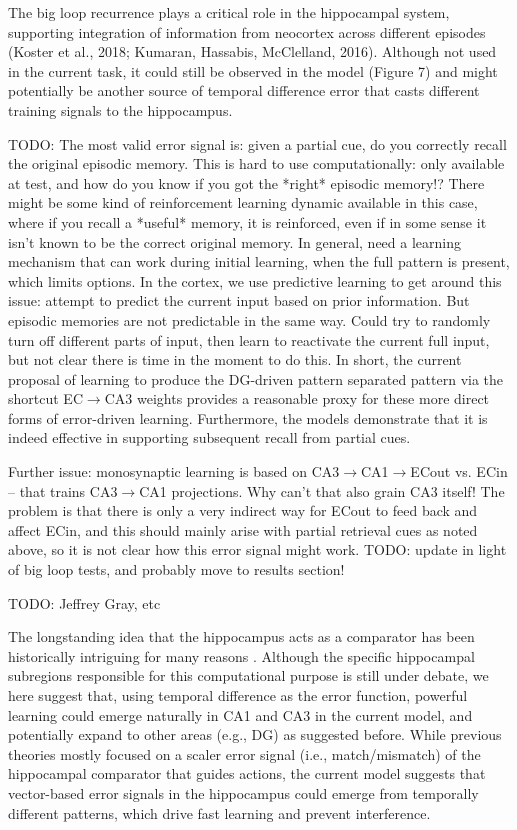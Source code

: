 \documentclass[11pt,twoside]{article}
\newif\myifpdf
\begin{document}
The big loop recurrence plays a critical role in the hippocampal system, supporting integration of information from neocortex across different episodes (Koster et al., 2018; Kumaran, Hassabis, McClelland, 2016). Although not used in the current task, it could still be observed in the model (Figure 7) and might potentially be another source of temporal difference error that casts different training signals to the hippocampus. 

TODO: The most valid error signal is: given a partial cue, do you correctly recall the original episodic memory.  This is hard to use computationally: only available at test, and how do you know if you got the *right* episodic memory!?  There might be some kind of reinforcement learning dynamic available in this case, where if you recall a *useful* memory, it is reinforced, even if in some sense it isn't known to be the correct original memory.  In general, need a learning mechanism that can work during initial learning, when the full pattern is present, which limits options.  In the cortex, we use predictive learning to get around this issue: attempt to predict the current input based on prior information.  But episodic memories are not predictable in the same way.  Could try to randomly turn off different parts of input, then learn to reactivate the current full input, but not clear there is time in the moment to do this.  In short, the current proposal of learning to produce the DG-driven pattern separated pattern via the shortcut EC$\rightarrow$CA3 weights provides a reasonable proxy for these more direct forms of error-driven learning.  Furthermore, the models demonstrate that it is indeed effective in supporting subsequent recall from partial cues.

Further issue: monosynaptic learning is based on CA3$\rightarrow$CA1$\rightarrow$ECout vs. ECin -- that trains CA3$\rightarrow$CA1 projections.  Why can't that also grain CA3 itself!  The problem is that there is only a very indirect way for ECout to feed back and affect ECin, and this should mainly arise with partial retrieval cues as noted above, so it is not clear how this error signal might work.  TODO: update in light of big loop tests, and probably move to results section!

TODO: Jeffrey Gray, etc

The longstanding idea that the hippocampus acts as a comparator has been historically intriguing for many reasons \citep{Gray82,Vinogradova01,LismanGrace05}.  Although the specific hippocampal subregions responsible for this computational purpose is still under debate, we here suggest that, using temporal difference as the error function, powerful learning could emerge naturally in CA1 \citep{KetzMorkondaOReilly13} and CA3 in the current model, and potentially expand to other areas (e.g., DG) as suggested before.  While previous theories mostly focused on a scaler error signal (i.e., match/mismatch) of the hippocampal comparator that guides actions, the current model suggests that vector-based error signals in the hippocampus could emerge from temporally different patterns, which drive fast learning and prevent interference. 
\end{document}
